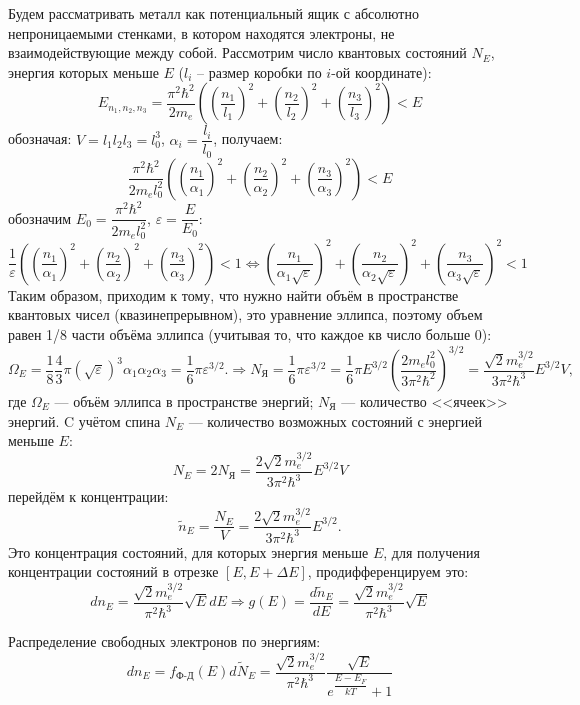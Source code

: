 Будем рассматривать металл как потенциальный ящик с абсолютно непроницаемыми стенками, в 
котором находятся электроны, не взаимодействующие между собой. Рассмотрим число квантовых состояний 
$N_E$, энергия которых меньше $E$ ($l_i$ -- размер коробки по $i$-ой координате):
\[
  E_{n_1, n_2, n_3} = \dfrac{\pi^2 \hbar^2}{2 m_e} \left(
    \left( \dfrac{n_1}{l_1} \right)^2 +
    \left( \dfrac{n_2}{l_2} \right)^2 +
    \left( \dfrac{n_3}{l_3} \right)^2 \right) < E
\]
обозначая: $V = l_1 l_2 l_3 = l_0^3$, $\alpha_i = \dfrac{l_i}{l_0}$, получаем:
\[
  \dfrac{\pi^2 \hbar^2}{2 m_e l_0^2} \left(
    \left( \dfrac{n_1}{\alpha_1} \right)^2 +
    \left( \dfrac{n_2}{\alpha_2} \right)^2 +
    \left( \dfrac{n_3}{\alpha_3} \right)^2 \right) < E
\]
обозначим $E_0 = \dfrac{\pi^2 \hbar^2}{2 m_e l_0^2}$, $\varepsilon = \dfrac{E}{E_0}$:
\[
  \dfrac{1}{\varepsilon} \left(
    \left( \dfrac{n_1}{\alpha_1} \right)^2 +
    \left( \dfrac{n_2}{\alpha_2} \right)^2 +
    \left( \dfrac{n_3}{\alpha_3} \right)^2\right) < 1
  \Leftrightarrow
  \left( \dfrac{n_1}{\alpha_1 \sqrt{\varepsilon}} \right)^2 +
    \left( \dfrac{n_2}{\alpha_2 \sqrt{\varepsilon}} \right)^2 +
    \left( \dfrac{n_3}{\alpha_3 \sqrt{\varepsilon}} \right)^2 < 1
\]
Таким образом, приходим к тому, что нужно найти объём в пространстве квантовых чисел
(квазинепрерывном), это уравнение эллипса, поэтому объем равен 1/8 части объёма эллипса
(учитывая то, что каждое кв число больше 0):
\[
  \Omega_E = \dfrac{1}{8} \dfrac{4}{3} \pi (\sqrt{\varepsilon})^3 \alpha_1 \alpha_2 \alpha_3
  = \dfrac{1}{6} \pi \varepsilon^{3/2}.
  \Rightarrow
  N_\text{Я} = \dfrac{1}{6} \pi \varepsilon^{3/2}
  = \dfrac{1}{6} \pi E^{3/2} \left( \dfrac{2 m_e l_0^2}{3 \pi^2 \hbar^2} \right)^{3/2}
  = \dfrac{\sqrt{2} m_e^{3/2}}{3 \pi^2 \hbar^3} E^{3/2} V,
\]
где $\Omega_E$ --- объём эллипса в пространстве энергий; $N_\text{Я}$ --- количество <<ячеек>>
энергий. C учётом спина $N_E$ --- количество возможных состояний с энергией меньше $E$:
\[
  N_E = 2 N_\text{Я} = \dfrac{2 \sqrt{2} m_e^{3/2}}{3 \pi^2 \hbar^3} E^{3/2} V 
\]
перейдём к концентрации:
\[
  \tilde n_E = \dfrac{N_E}{V} = \dfrac{2 \sqrt{2} m_e^{3/2}}{3 \pi^2 \hbar^3} E^{3/2}.
\]
Это концентрация состояний, для которых энергия меньше $E$, для получения концентрации состояний в
отрезке $[E, E+\Delta E]$, продифференцируем это:
\[
  dn_E = \dfrac{\sqrt{2} m_e^{3/2}}{\pi^2 \hbar^3} \sqrt{E} dE
  \Rightarrow
  g(E) = \dfrac{d\tilde n_E}{dE} = \dfrac{\sqrt{2} m_e^{3/2}}{\pi^2 \hbar^3} \sqrt{E}
\]

Распределение свободных электронов по энергиям:
\[
  dn_E = f_\text{Ф-Д} (E) d\tilde N_E = \dfrac{\sqrt{2} m_e^{3/2}}{\pi^2 \hbar^3} \dfrac{\sqrt{E}}{e^{\dfrac{E-E_F}{kT}} + 1}
\]

